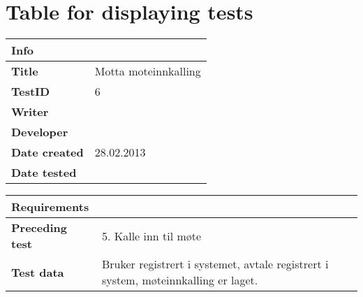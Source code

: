 \section{Table for displaying tests}

\begin{tabular}{|l|l|}
\hline
\cellcolor{blue!25}\textbf{Info} & \cellcolor{blue!25}\\
 \hline
\textbf{Title} & Motta moteinnkalling\\
\textbf{TestID} & 6\\
\textbf{Writer}&\\
 
\textbf{Developer}&\\
 
\textbf{Date created}& 28.02.2013\\
\textbf{Date tested}&\\
\hline
\end{tabular}
\begin{tabular}{|l|p{5cm}|}
\hline
\cellcolor{blue!25}\textbf{Requirements}&\\
 \hline
\textbf{Preceding test}& 5. Kalle inn til møte\\
\textbf{Test data} &Bruker registrert i systemet, avtale registrert i system, møteinnkalling er laget.\\
\hline
\end{tabular}



